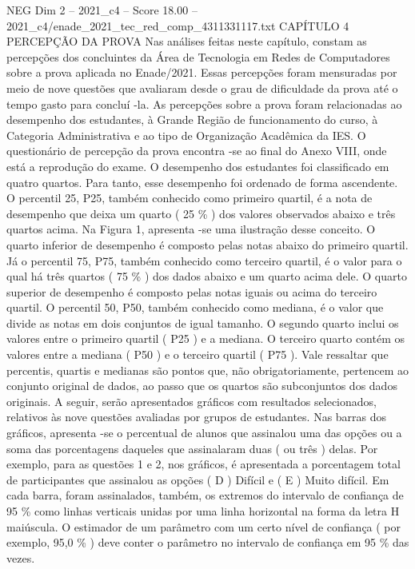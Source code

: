 \begin{textsample}{NEG Dim 2 – 2021\_c4 – Score 18.00 – 2021\_c4/enade\_2021\_tec\_red\_comp\_4311331117.txt}  \label{ex:f2_neg_400}
CAPÍTULO 4 PERCEPÇÃO DA PROVA Nas análises feitas neste capítulo, constam as percepções dos concluintes da Área de Tecnologia em Redes de Computadores sobre a prova aplicada no Enade/2021.
Essas percepções foram mensuradas por meio de nove questões que avaliaram desde o grau de dificuldade da prova até o tempo gasto para concluí -la.
As percepções sobre a prova foram relacionadas ao desempenho dos estudantes, à Grande Região de funcionamento do curso, à Categoria Administrativa e ao tipo de Organização Acadêmica da IES.
O questionário de percepção da prova encontra -se ao final do Anexo VIII, onde está a reprodução do exame.
O desempenho dos estudantes foi classificado em quatro quartos.
Para tanto, esse desempenho foi ordenado de forma ascendente.
O percentil 25, P25, também conhecido como primeiro quartil, é a nota de desempenho que deixa um quarto ( 25 \% ) dos valores observados abaixo e três quartos acima.
Na Figura 1, apresenta -se uma ilustração desse conceito.
O quarto inferior de desempenho é composto pelas notas abaixo do primeiro quartil.
Já o percentil 75, P75, também conhecido como terceiro quartil, é o valor para o qual há três quartos ( 75 \% ) dos dados abaixo e um quarto acima dele.
O quarto superior de desempenho é composto pelas notas iguais ou acima do terceiro quartil.
O percentil 50, P50, também conhecido como mediana, é o valor que divide as notas em dois conjuntos de igual tamanho.
O segundo quarto inclui os valores entre o primeiro quartil ( P25 ) e a mediana.
O terceiro quarto contém os valores entre a mediana ( P50 ) e o terceiro quartil ( P75 ).
Vale ressaltar que percentis, quartis e medianas são pontos que, não obrigatoriamente, pertencem ao conjunto original de dados, ao passo que os quartos são subconjuntos dos dados originais.
A seguir, serão apresentados gráficos com resultados selecionados, relativos às nove questões avaliadas por grupos de estudantes.
Nas barras dos gráficos, apresenta -se o percentual de alunos que assinalou uma das opções ou a soma das porcentagens daqueles que assinalaram duas ( ou três ) delas.
Por exemplo, para as questões 1 e 2, nos gráficos, é apresentada a porcentagem total de participantes que assinalou as opções ( D ) Difícil e ( E ) Muito difícil.
Em cada barra, foram assinalados, também, os extremos do intervalo de confiança de 95 \% como linhas verticais unidas por uma linha horizontal na forma da letra H maiúscula.
O estimador de um parâmetro com um certo nível de confiança ( por exemplo, 95,0 \% ) deve conter o parâmetro no intervalo de confiança em 95 \% das vezes.

\end{textsample}
